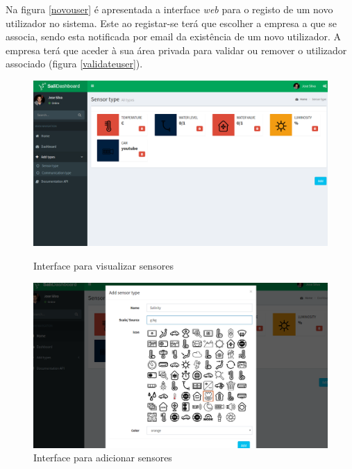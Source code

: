 Na figura \ref{novouser} é apresentada a interface \textit{web} para o registo de um novo utilizador no sistema. Este ao registar-se terá que escolher a empresa a que se associa, sendo esta notificada por email da existência de um novo utilizador. A empresa terá que aceder à sua área privada para validar ou remover o utilizador associado (figura \ref{validateuser}).



\begin{figure}[h]
	\centering
	\begin{minipage}[b]{0.49\textwidth}
		\centering
		\includegraphics[width=\textwidth]{prints-web/sensor_show.png}
		\caption{Interface para visualizar sensores}
		\label{view-sensorall}
	\end{minipage}
	\hfill
	\begin{minipage}[b]{0.49\textwidth}
		\centering
		\includegraphics[width=\textwidth]{prints-web/sensor_add.png}
		\caption{ Interface para adicionar sensores}
		\label{add-sensorall}
	\end{minipage}
\end{figure}


